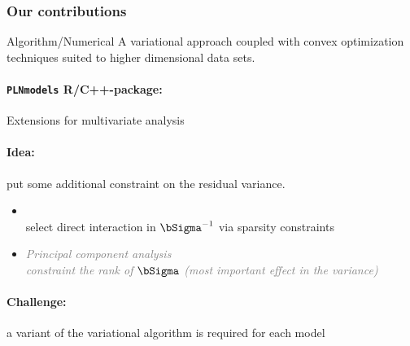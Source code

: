 \begin{frame}
  \frametitle{Our contributions}

  \begin{block}{Algorithm/Numerical}
    A variational approach coupled with convex optimization techniques suited to higher dimensional data sets.
    
    \paragraph{{\tt PLNmodels} R/C++-package:}  
  \end{block}
  
  \vfill
  
  \begin{block}{Extensions for multivariate analysis}
     \paragraph{Idea:} put some additional constraint on the residual variance.
      \begin{itemize}
      \item {} \\
        \rsa select direct interaction in $\bSigma^{-1}$ via sparsity constraints
        
      \item \textcolor{gray}{\it Principal component analysis}\\
        \textcolor{gray}{\it constraint the rank of $\bSigma$ (most important effect in the variance)}

    \end{itemize}

    \paragraph{Challenge:} a variant of the variational algorithm is required for each model
  \end{block}


\end{frame}

\begin{knitrout}
\color{fgcolor}\begin{kframe}


{\ttfamily\noindent\itshape\color{messagecolor}{\#\# \\\#\# Attaching package: 'igraph'}}

{\ttfamily\noindent\itshape\color{messagecolor}{\#\# The following objects are masked from 'package:stats':\\\#\# \\\#\#\ \ \ \  decompose, spectrum}}

{\ttfamily\noindent\itshape\color{messagecolor}{\#\# The following object is masked from 'package:base':\\\#\# \\\#\#\ \ \ \  union}}\end{kframe}
\end{knitrout}

